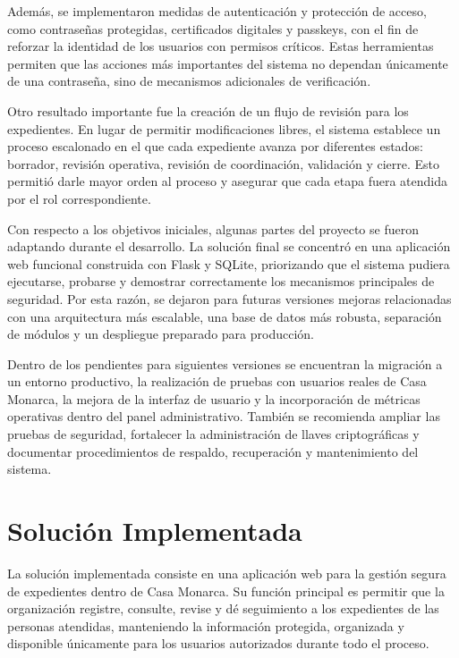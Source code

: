 \documentclass[10pt, letterpaper]{article}
\begin{document}
Además, se implementaron medidas de autenticación y protección de acceso, como contraseñas protegidas, certificados digitales y passkeys, con el fin de reforzar la identidad de los usuarios con permisos críticos. Estas herramientas permiten que las acciones más importantes del sistema no dependan únicamente de una contraseña, sino de mecanismos adicionales de verificación.

Otro resultado importante fue la creación de un flujo de revisión para los expedientes. En lugar de permitir modificaciones libres, el sistema establece un proceso escalonado en el que cada expediente avanza por diferentes estados: borrador, revisión operativa, revisión de coordinación, validación y cierre. Esto permitió darle mayor orden al proceso y asegurar que cada etapa fuera atendida por el rol correspondiente.

Con respecto a los objetivos iniciales, algunas partes del proyecto se fueron adaptando durante el desarrollo. La solución final se concentró en una aplicación web funcional construida con Flask y SQLite, priorizando que el sistema pudiera ejecutarse, probarse y demostrar correctamente los mecanismos principales de seguridad. Por esta razón, se dejaron para futuras versiones mejoras relacionadas con una arquitectura más escalable, una base de datos más robusta, separación de módulos y un despliegue preparado para producción.

Dentro de los pendientes para siguientes versiones se encuentran la migración a un entorno productivo, la realización de pruebas con usuarios reales de Casa Monarca, la mejora de la interfaz de usuario y la incorporación de métricas operativas dentro del panel administrativo. También se recomienda ampliar las pruebas de seguridad, fortalecer la administración de llaves criptográficas y documentar procedimientos de respaldo, recuperación y mantenimiento del sistema.


\section{Solución Implementada}

La solución implementada consiste en una aplicación web para la gestión segura de expedientes dentro de Casa Monarca. Su función principal es permitir que la organización registre, consulte, revise y dé seguimiento a los expedientes de las personas atendidas, manteniendo la información protegida, organizada y disponible únicamente para los usuarios autorizados durante todo el proceso.
\end{document}
